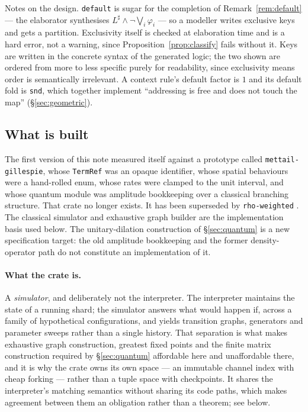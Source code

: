 \documentclass[11pt,a4paper]{article}
\theoremstyle{plain}
\theoremstyle{definition}
\theoremstyle{remark}
\begin{document}
Notes on the design. \texttt{default} is sugar for the completion of
Remark~\ref{rem:default} --- the elaborator synthesises
$L^\sharp \wedge \neg\bigvee_i \varphi_i$ --- so a modeller writes exclusive keys and gets a
partition. Exclusivity itself is checked at elaboration time and is a hard error, not a warning,
since Proposition~\ref{prop:classify} fails without it. Keys are written in the concrete syntax of
the generated logic; the two shown are ordered from more to less specific purely for readability,
since exclusivity means order is semantically irrelevant. A context rule's default factor is
$1$ and its default fold is \texttt{snd}, which together implement ``addressing is free and does not
touch the map'' (\S\ref{sec:geometric}).

\subsection{What is built}
\label{sec:built}

The first version of this note measured itself against a prototype called \texttt{mettail-gillespie},
whose \texttt{TermRef} was an opaque identifier, whose spatial behaviours were a hand-rolled enum,
whose rates were clamped to the unit interval, and whose quantum module was amplitude bookkeeping
over a classical branching structure. That crate no longer exists. It has been superseded by
\texttt{rho-weighted} \cite{gillespie-crate}. The classical simulator and exhaustive graph builder are
the implementation basis used below. The unitary-dilation construction of \S\ref{sec:quantum} is a
new specification target: the old amplitude bookkeeping and the former density-operator path do not
constitute an implementation of it.

\paragraph{What the crate is.} A \emph{simulator}, and deliberately not the interpreter. The
interpreter maintains the state of a running shard; the simulator answers what would happen if,
across a family of hypothetical configurations, and yields transition graphs, generators and
parameter sweeps rather than a single history. That separation is what makes exhaustive graph
construction, greatest fixed points and the finite matrix construction required by
\S\ref{sec:quantum} affordable here and unaffordable there, and it is why the crate owns its own space --- an immutable channel index with
cheap forking --- rather than a tuple space with checkpoints. It shares the interpreter's matching
semantics without sharing its code paths, which makes agreement between them an obligation rather
than a theorem; see below.
\end{document}
